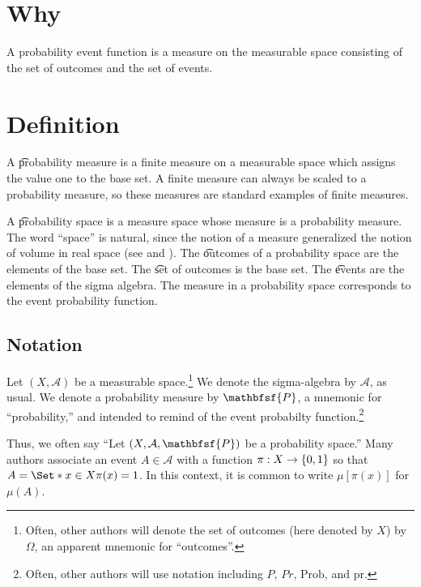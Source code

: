 

\section*{Why}

A probability event function is a measure on the measurable space consisting of the set of outcomes and the set of events.

\section*{Definition}

A \t{probability measure} is a finite measure on a measurable space which assigns the value one to the base set.
A finite measure can always be scaled to a probability measure, so these measures are standard examples of finite measures.

A \t{probability space} is a measure space whose measure is a probability measure.
The word ``space'' is natural, since the notion of a measure generalized the notion of volume in real space (see and ).
The \t{outcomes} of a probability space are the elements of the base set.
The \t{set of outcomes} is the base set.
The \t{events} are the elements of the sigma algebra.
The measure in a probability space corresponds to the event probability function.

\subsection*{Notation}

Let $(X, \mathcal{A} )$ be a measurable space.\footnote{Often, other authors will denote the set of outcomes (here denoted by $X$) by $\Omega $, an apparent mnemonic for ``outcomes''.}
We denote the sigma-algebra by $\mathcal{A} $, as usual.
We denote a probability measure by $\mathbfsf{P} $, a mnemonic for ``probability,'' and intended to remind of the event probabilty function.\footnote{Often, other authors will use notation including $P$, $Pr$, $\text{Prob}$, and $\text{pr}$.}

Thus, we often say ``Let $(X, \mathcal{A} , \mathbfsf{P} )$ be a probability space.''
Many authors associate an event $A \in \mathcal{A} $ with a function $\pi : X \to \{0, 1\}$ so that $A = \Set*{x \in X}{\pi (x) = 1}$.
In this context, it is common to write $\mu [\pi (x)]$ for $\mu (A)$.

\blankpage